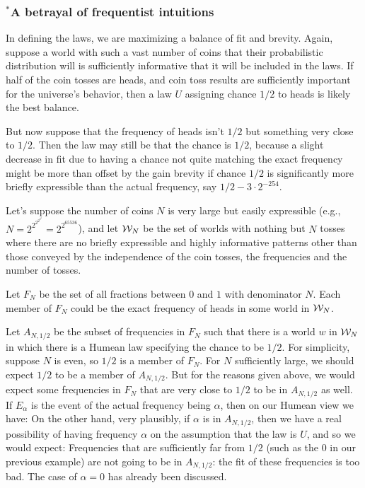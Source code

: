 
\subsubsection{$^*$A betrayal of frequentist intuitions}
In defining the laws, we are maximizing a balance of fit and brevity. 
Again, suppose a world with such a vast number of coins that their probabilistic distribution will
is sufficiently informative that it will be included in the laws. If half of the coin tosses are heads, 
and coin toss results are sufficiently important for the universe's behavior, then a law $U$ assigning 
chance $1/2$ to heads is likely the best balance. 

But now suppose that the frequency of heads isn't $1/2$
but something very close to $1/2$. Then the law may still be that the chance is $1/2$, because a slight decrease in fit due to having
a chance not quite matching the exact frequency might be more than offset by the gain brevity if chance $1/2$ is significantly more
briefly expressible than the actual frequency, say $1/2-3\cdot 2^{-254}$.

Let's suppose the number of coins $N$ is very large but easily expressible (e.g., $N=2^{2^{2^{2^{2^2}}}}=2^{2^{65536}}$), and let $\mathcal W_N$ be 
the set of worlds with nothing but $N$ tosses where there are no briefly expressible and highly informative patterns other than 
those conveyed by the independence of the coin tosses, the frequencies and the number of tosses.

Let $F_N$ be the set of all fractions between $0$ and $1$ with denominator $N$. Each member of $F_N$ could be the exact frequency
of heads in some world in $\mathcal W_N$.

Let $A_{N,1/2}$ be the subset of frequencies in $F_N$ such that there is a world $w$ in $\mathcal W_N$ in which there is a Humean
law specifying the chance to be $1/2$. For simplicity, suppose $N$ is even, so $1/2$ is a member of $F_N$. For $N$ sufficiently large, we 
should expect $1/2$ to be a member of $A_{N,1/2}$. But for the reasons given above, we would expect some frequencies in $F_N$ that are very
close to $1/2$ to be in $A_{N,1/2}$ as well. If $E_\alpha$ is the event of the actual frequency being $\alpha$, then on our Humean
view we have:
On the other hand, very plausibly, if $\alpha$ is in $A_{N,1/2}$, then we have a real possibility of having frequency $\alpha$
on the assumption that the law is $U$, and so we would expect:
Frequencies that are sufficiently far from $1/2$ (such as the $0$ in our previous example) are not going to be in $A_{N,1/2}$: the fit 
of these frequencies is too bad. The case of $\alpha=0$ has already been discussed.

